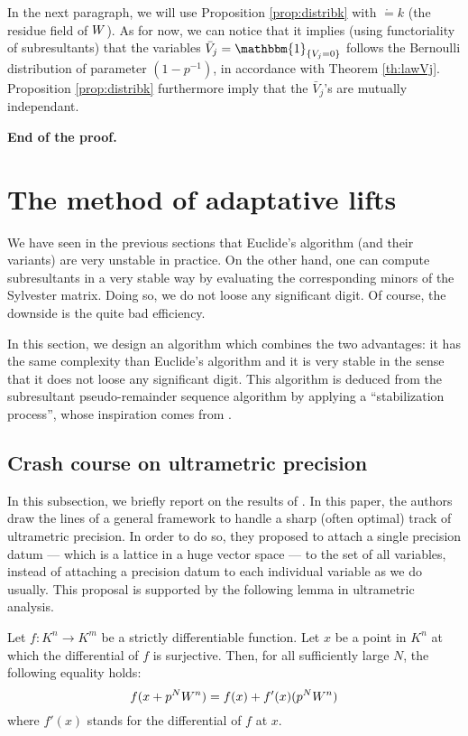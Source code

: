 \documentclass{sig-alternate}
\begin{document}
\begin{rem}
In the next paragraph, we will use Proposition \ref{prop:distribk} 
with $\ring = k$ (the residue field of $W$). As for now, we can 
notice that it implies (using functoriality of subresultants) that
the variables $\bar V_j = \mathbbm{1}_{\{V_j = 0\}}$ follows the 
Bernoulli distribution of parameter $(1 - p^{-1})$, in accordance
with Theorem \ref{th:lawVj}. Proposition \ref{prop:distribk} 
furthermore imply that the $\bar V_j$'s are mutually independant.
\end{rem}

\noindent
\textbf{End of the proof.}

\section{The method of adaptative lifts}

We have seen in the previous sections that Euclide's algorithm (and 
their variants) are very unstable in practice. On the other hand, 
one can compute subresultants in a very stable way by evaluating
the corresponding minors of the Sylvester matrix. Doing so, we do
not loose any significant digit. Of course, the downside is the
quite bad efficiency.

In this section, we design an algorithm which combines the two
advantages: it has the same complexity than Euclide's algorithm
and it is very stable in the sense that it does not loose any
significant digit. 
This algorithm is deduced from the subresultant pseudo-remainder
sequence algorithm by applying a ``stabilization process'', whose 
inspiration comes from \cite{}.

\subsection{Crash course on ultrametric precision}

In this subsection, we briefly report on the results of \cite{}. In this 
paper, the authors draw the lines of a general framework to handle a 
sharp (often optimal) track of ultrametric precision. In order to do so, 
they proposed to attach a single precision datum --- which is a lattice 
in a huge vector space --- to the set of all variables, instead of 
attaching a precision datum to each individual variable as we do 
usually. This proposal is supported by the following lemma in ultrametric
analysis.

\begin{lem}
\label{lem:padicprec}
Let $f : K^n \to K^m$ be a strictly differentiable function. Let $x$
be a point in $K^n$ at which the differential of $f$ is surjective.
Then, for all sufficiently large $N$, the following equality holds:
\begin{equation}
\label{eq:padicprec}
f(x + p^N W^n) = f(x) + f'(x)(p^N W^n)
\end{equation}
where $f'(x)$ stands for the differential of $f$ at $x$.
\end{lem}
\end{document}
